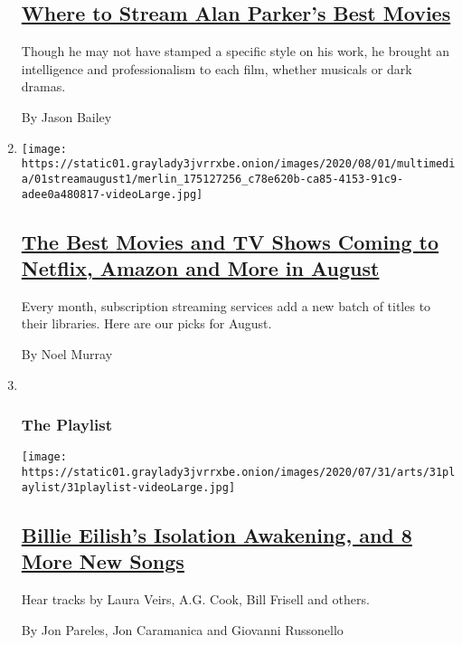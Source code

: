 \begin{enumerate}
{  \subsection{\texorpdfstring{\href{/2020/07/31/movies/alan-parker-stream.html}{Where
  to Stream Alan Parker's Best
  Movies}}{Where to Stream Alan Parker's Best Movies}}\label{where-to-stream-alan-parkers-best-movies}}

  Though he may not have stamped a specific style on his work, he
  brought an intelligence and professionalism to each film, whether
  musicals or dark dramas.

  By Jason Bailey
\item
  \texttt{[image: https://static01.graylady3jvrrxbe.onion/images/2020/08/01/multimedia/01streamaugust1/merlin\_175127256\_c78e620b-ca85-4153-91c9-adee0a480817-videoLarge.jpg]}

  \hypertarget{the-best-movies-and-tv-shows-coming-to-netflix-amazon-and-more-in-august}{%
  \subsection{\texorpdfstring{\href{/2020/07/31/arts/television/new-to-stream-netflix.html}{The
  Best Movies and TV Shows Coming to Netflix, Amazon and More in
  August}}{The Best Movies and TV Shows Coming to Netflix, Amazon and More in August}}\label{the-best-movies-and-tv-shows-coming-to-netflix-amazon-and-more-in-august}}

  Every month, subscription streaming services add a new batch of titles
  to their libraries. Here are our picks for August.

  By Noel Murray
\item ~
  \hypertarget{the-playlist}{%
  \subsubsection{The Playlist}\label{the-playlist}}

  \texttt{[image: https://static01.graylady3jvrrxbe.onion/images/2020/07/31/arts/31playlist/31playlist-videoLarge.jpg]}

  \hypertarget{billie-eilishs-isolation-awakening-and-8-more-new-songs}{%
  \subsection{\texorpdfstring{\href{/2020/07/31/arts/music/playlist-billie-eilish-snakehips-a-boogie.html}{Billie
  Eilish's Isolation Awakening, and 8 More New
  Songs}}{Billie Eilish's Isolation Awakening, and 8 More New Songs}}\label{billie-eilishs-isolation-awakening-and-8-more-new-songs}}

  Hear tracks by Laura Veirs, A.G. Cook, Bill Frisell and others.

  By Jon Pareles, Jon Caramanica and Giovanni Russonello
\end{enumerate}


